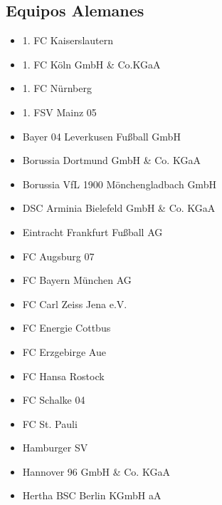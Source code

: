 \subsection{Equipos Alemanes}
\label{sec:equipos-ger}
\begin{multicols}{2}
	\begin{itemize}
	    \setlength{\itemsep}{1pt}
	    \setlength{\parskip}{0pt}
	    \setlength{\parsep}{0pt}

		\item 1. FC Kaiserslautern

		\item 1. FC Köln GmbH \& Co.KGaA

		\item 1. FC Nürnberg

		\item 1. FSV Mainz 05

		\item Bayer 04 Leverkusen Fußball GmbH

		\item Borussia Dortmund GmbH \& Co. KGaA

		\item Borussia VfL 1900 Mönchengladbach GmbH

		\item DSC Arminia Bielefeld GmbH \& Co. KGaA

		\item Eintracht Frankfurt Fußball AG

		\item FC Augsburg 07

		\item FC Bayern München AG

		\item FC Carl Zeiss Jena e.V.

		\item FC Energie Cottbus

		\item FC Erzgebirge Aue

		\item FC Hansa Rostock

		\item FC Schalke 04

		\item FC St. Pauli

		\item Hamburger SV

		\item Hannover 96 GmbH \& Co. KGaA

		\item Hertha BSC Berlin KGmbH aA


\end{itemize}
\end{multicols}
